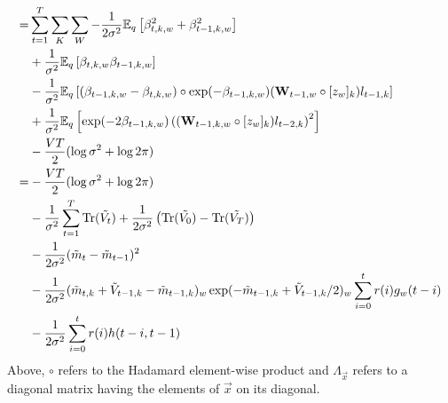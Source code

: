 \documentclass{article}
\newcommand{\mv}{\tilde{m}}
\newcommand{\vv}[0]{\tilde{V}}
\newcommand{\W}{\textbf{W}}
\newcommand{\lv}{\tilde{l}}
\newcommand{\tr}[0]{\mbox{Tr}}
\newcommand{\expectq}[1]{\mathbb{E}_q\left[#1\right]}
\begin{document}
\begin{align}
 = & \sum_{t=1}^T \sum_K \sum_W
   - \frac{1}{2 \sigma^2} \expectq{ \beta_{t,k,w}^2 + \beta_{t-1,k,w}^2 } \\
    & + \frac{1}{\sigma^2} \expectq{ \beta_{t,k,w} \beta_{t-1,k,w} } \notag \\
    & - \frac{1}{\sigma^2} \expectq{ (\beta_{t-1,k,w} - \beta_{t,k,w}) \circ \exp(-\beta_{t-1,k,w}) (\W_{t-1,w} \circ [ z_w ]_k) l_{t-1,k} } \notag \\
    & + \frac{1}{\sigma^2} \expectq{ \exp(-2 \beta_{t-1,k,w}) \left( (\W_{t-1,k,w} \circ [ z_w ]_k ) l_{t-2,k} \right)^2 } \notag \\
    & - \frac{VT}{2} (\log \sigma^2 + \log 2 \pi) \notag \\
 = & - \frac{VT}{2} (\log \sigma^2 + \log 2 \pi) \notag \\
  & - \frac{1}{\sigma^2} \sum_{t=1}^T \tr(\tilde{V_t}) + \frac{1}{2 \sigma^2} \left(\tr(\tilde{V_0}) - \tr(\tilde{V_T}) \right) \notag \\
  & - \frac{1}{2 \sigma^2} (\mv_t - \mv_{t-1})^2 \\
  & - \frac{1}{2 \sigma^2} (\mv_{t,k} + \vv_{t-1, k} - \mv_{t-1,k})_w \exp(-\mv_{t-1,k} + \vv_{t-1,k} / 2)_w \sum_{i=0}^t r(i) g_w(t-i) \\
  & - \frac{1}{2 \sigma^2} \sum_{i=0}^t r(i) h(t - i, t-1) \\
\end{align}
Above, $\circ$ refers to the Hadamard element-wise product and
$\Lambda_{\vec{x}}$ refers to a diagonal matrix having the elements of
$\vec{x}$ on its diagonal.
\end{document}
